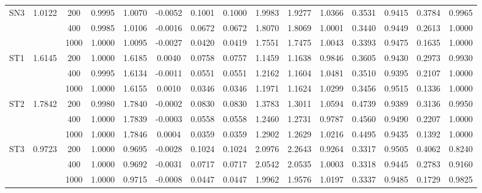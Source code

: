 \documentclass[11pt,a4paper]{article}
\theoremstyle{definition}
\theoremstyle{remark}
\newcommand{\1}{\mathbf{1}}
\begin{document}
\begin{table}[h!]
\begin{tabular*}{\textwidth}{@{\extracolsep\fill}lcccccccccccccc@{\extracolsep\fill}}
\midrule

\multirow{3}{*}{SN3} & \multirow{3}{*}{1.0122}
& 200  & 0.9995 & 1.0070 & -0.0052 & 0.1001 & 0.1000 & 1.9983 & 1.9277 & 1.0366 & 0.3531 & 0.9415 & 0.3784 & 0.9965 \\
& & 400  & 0.9985 & 1.0106 & -0.0016 & 0.0672 & 0.0672 & 1.8070 & 1.8069 & 1.0001 & 0.3440 & 0.9449 & 0.2613 & 1.0000 \\
& & 1000 & 1.0000 & 1.0095 & -0.0027 & 0.0420 & 0.0419 & 1.7551 & 1.7475 & 1.0043 & 0.3393 & 0.9475 & 0.1635 & 1.0000 \\

\midrule

\multirow{3}{*}{ST1} & \multirow{3}{*}{1.6145}
& 200  & 1.0000 & 1.6185 &  0.0040 & 0.0758 & 0.0757 & 1.1459 & 1.1638 & 0.9846 & 0.3605 & 0.9430 & 0.2973 & 0.9930 \\
& & 400  & 0.9995 & 1.6134 & -0.0011 & 0.0551 & 0.0551 & 1.2162 & 1.1604 & 1.0481 & 0.3510 & 0.9395 & 0.2107 & 1.0000 \\
& & 1000 & 1.0000 & 1.6155 &  0.0010 & 0.0346 & 0.0346 & 1.1971 & 1.1624 & 1.0299 & 0.3456 & 0.9515 & 0.1336 & 1.0000 \\

\midrule

\multirow{3}{*}{ST2} & \multirow{3}{*}{1.7842}
& 200  & 0.9980 & 1.7840 & -0.0002 & 0.0830 & 0.0830 & 1.3783 & 1.3011 & 1.0594 & 0.4739 & 0.9389 & 0.3136 & 0.9950 \\
& & 400  & 1.0000 & 1.7839 & -0.0003 & 0.0558 & 0.0558 & 1.2460 & 1.2731 & 0.9787 & 0.4560 & 0.9490 & 0.2207 & 1.0000 \\
& & 1000 & 1.0000 & 1.7846 &  0.0004 & 0.0359 & 0.0359 & 1.2902 & 1.2629 & 1.0216 & 0.4495 & 0.9435 & 0.1392 & 1.0000 \\

\midrule

\multirow{3}{*}{ST3} & \multirow{3}{*}{0.9723}
& 200  & 1.0000 & 0.9695 & -0.0028 & 0.1024 & 0.1024 & 2.0976 & 2.2643 & 0.9264 & 0.3317 & 0.9505 & 0.4062 & 0.8240 \\
& & 400  & 1.0000 & 0.9692 & -0.0031 & 0.0717 & 0.0717 & 2.0542 & 2.0535 & 1.0003 & 0.3318 & 0.9445 & 0.2783 & 0.9160 \\
& & 1000 & 1.0000 & 0.9715 & -0.0008 & 0.0447 & 0.0447 & 1.9962 & 1.9576 & 1.0197 & 0.3337 & 0.9485 & 0.1729 & 0.9825 \\

\bottomrule
\end{tabular*}


\end{table}
\end{document}
